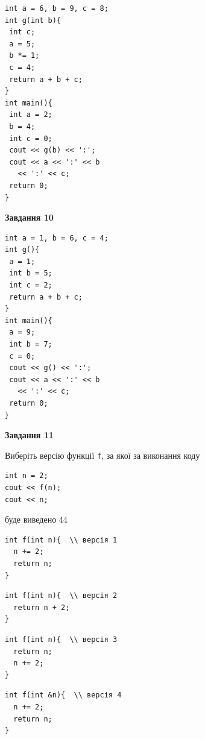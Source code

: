 \documentclass[12pt, ukrainian]{article}
\def\code#1{\Verb!#1!}
\begin{document}
{\begin {large}
\begin{minipage}[t]{7.0cm}
\begin{verbatim}
int a = 6, b = 9, c = 8;
int g(int b){
 int c;
 a = 5;
 b *= 1;
 c = 4;
 return a + b + c;
}
int main(){
 int a = 2;
 b = 4;
 int c = 0;
 cout << g(b) << ':';
 cout << a << ':' << b 
   << ':' << c;
 return 0;
}
\end{verbatim}



\begin{center}
\textbf{Завдання 10}
\end{center}
\vspace{-8mm}

\begin{verbatim}
int a = 1, b = 6, c = 4;
int g(){
 a = 1;
 int b = 5;
 int c = 2;
 return a + b + c;
}
int main(){
 a = 9;
 int b = 7;
 c = 0;
 cout << g() << ':';
 cout << a << ':' << b 
   << ':' << c;
 return 0;
}
\end{verbatim}

\end{minipage}
\vline \hspace{1mm}
\begin{minipage}[t]{11.0cm}

\begin{center}
\textbf{Завдання 11}
\end{center}
Виберіть версію функції \code{f}, за якої за виконання коду
\begin{verbatim}
int n = 2;
cout << f(n);
cout << n;
\end{verbatim}

буде виведено 44

\begin{verbatim}
int f(int n){  \\ версія 1
  n += 2;
  return n;
}
\end{verbatim}

\vspace{-8mm}\begin{verbatim}
int f(int n){  \\ версія 2
  return n + 2;
}
\end{verbatim}

\vspace{-8mm}\begin{verbatim}
int f(int n){  \\ версія 3
  return n;
  n += 2;
}
\end{verbatim}

\vspace{-8mm}\begin{verbatim}
int f(int &n){  \\ версія 4
  n += 2;
  return n;
}
\end{verbatim}




\end{minipage}
\end{large}}
\end{document}
